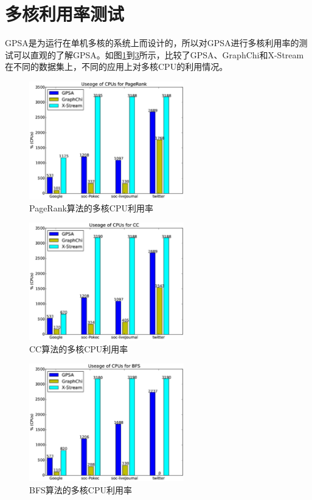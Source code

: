 \section{多核利用率测试}
GPSA是为运行在单机多核的系统上而设计的，所以对GPSA进行多核利用率的测试可以直观的了解GPSA。如图\ref{res:usagepr}到\ref{res:usagebfs}所示，比较了GPSA、GraphChi和X-Stream在不同的数据集上，不同的应用上对多核CPU的利用情况。
\begin{figure}[htbp]
\centering
\includegraphics[width=0.6\textwidth,scale=0.8]{myfigures/usagepr2.eps}
\caption{PageRank算法的多核CPU利用率}
\label{res:usagepr}
\end{figure}
\begin{figure}[htbp]
\centering
\includegraphics[width=0.6\textwidth,scale=0.8]{myfigures/usagecc2.eps}
\caption{CC算法的多核CPU利用率}
\label{res:usagecc}
\end{figure}
\begin{figure}[htbp]
\centering
\includegraphics[width=0.6\textwidth,scale=0.8]{myfigures/usagebfs2.eps}
\caption{BFS算法的多核CPU利用率}
\label{res:usagebfs}
\end{figure}


